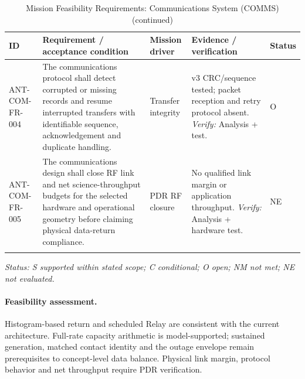 \begin{table}[H]\centering\small\setlength{\tabcolsep}{3pt}
\ContinuedFloat\captionsetup{list=no}
\caption{Mission Feasibility Requirements: Communications System (COMMS) (continued)}
\begin{tabular}{@{}
>{\RaggedRight\arraybackslash}p{}
>{\RaggedRight\arraybackslash}p{}
>{\RaggedRight\arraybackslash}p{}
>{\RaggedRight\arraybackslash}p{}
>{\RaggedRight\arraybackslash}p{}
@{}}
\toprule ID & Requirement / acceptance condition & Mission driver & Evidence / verification & Status\\\midrule
{}\label{req:ANT-COM-FR-004}\mbox{ANT-COM-}\newline\mbox{FR-004} & The communications protocol shall detect corrupted or missing records and resume interrupted transfers with identifiable sequence, acknowledgement and duplicate handling. & Transfer integrity & v3 CRC/sequence tested; packet reception and retry protocol absent. \emph{Verify:} Analysis + test. & O\\
\addlinespace[3pt]
\label{req:ANT-COM-FR-005}\mbox{ANT-COM-}\newline\mbox{FR-005} & The communications design shall close RF link and net science-throughput budgets for the selected hardware and operational geometry before claiming physical data-return compliance. & PDR RF closure & No qualified link margin or application throughput. \emph{Verify:} Analysis + hardware test. & NE\\
\addlinespace[3pt]
\bottomrule
\end{tabular}
\end{table}
\textit{Status: S supported within stated scope; C conditional; O open; NM not met; NE not evaluated.}
\paragraph{Feasibility assessment.} Histogram-based return and scheduled Relay are consistent with the current architecture. Full-rate capacity arithmetic is model-supported; sustained generation, matched contact identity and the outage envelope remain prerequisites to concept-level data balance. Physical link margin, protocol behavior and net throughput require PDR verification.

